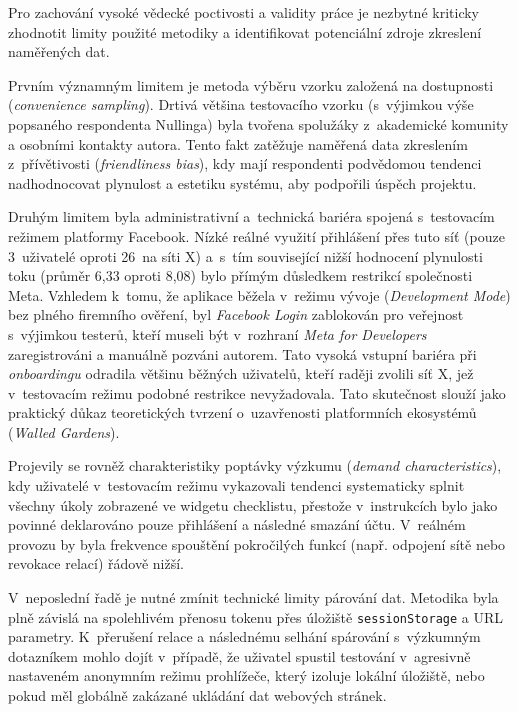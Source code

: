 \documentclass[male,czech,api_bc]{kitheses}
\begin{document}
Pro zachování vysoké vědecké poctivosti a validity práce je nezbytné kriticky zhodnotit limity použité metodiky a identifikovat potenciální zdroje zkreslení naměřených dat. 

Prvním významným limitem je metoda výběru vzorku založená na dostupnosti (\textit{convenience sampling}). Drtivá většina testovacího vzorku (s~výjimkou výše popsaného respondenta Nullinga) byla tvořena spolužáky z~akademické komunity a osobními kontakty autora. Tento fakt zatěžuje naměřená data zkreslením z~přívětivosti (\textit{friendliness bias}), kdy mají respondenti podvědomou tendenci nadhodnocovat plynulost a estetiku systému, aby podpořili úspěch projektu.

Druhým limitem byla administrativní a~technická bariéra spojená s~testovacím režimem platformy Facebook. Nízké reálné využití přihlášení přes tuto síť (pouze 3~uživatelé oproti 26~na síti X) a~s~tím související nižší hodnocení plynulosti toku (průměr 6,33 oproti 8,08) bylo přímým důsledkem restrikcí společnosti Meta. Vzhledem k~tomu, že aplikace běžela v~režimu vývoje (\textit{Development Mode}) bez plného firemního ověření, byl \textit{Facebook Login} zablokován pro veřejnost s~výjimkou testerů, kteří museli být v~rozhraní \textit{Meta for Developers} zaregistrováni a manuálně pozváni autorem. Tato vysoká vstupní bariéra při \textit{onboardingu} odradila většinu běžných uživatelů, kteří raději zvolili síť X, jež v~testovacím režimu podobné restrikce nevyžadovala. Tato skutečnost slouží jako praktický důkaz teoretických tvrzení o~uzavřenosti platformních ekosystémů (\textit{Walled Gardens}).

Projevily se rovněž charakteristiky poptávky výzkumu (\textit{demand characteristics}), kdy uživatelé v~testovacím režimu vykazovali tendenci systematicky splnit všechny úkoly zobrazené ve widgetu checklistu, přestože v~instrukcích bylo jako povinné deklarováno pouze přihlášení a následné smazání účtu. V~reálném provozu by byla frekvence spouštění pokročilých funkcí (např. odpojení sítě nebo revokace relací) řádově nižší.

V~neposlední řadě je nutné zmínit technické limity párování dat. Metodika byla plně závislá na spolehlivém přenosu tokenu přes úložiště \texttt{sessionStorage} a URL parametry. K~přerušení relace a následnému selhání spárování s~výzkumným dotazníkem mohlo dojít v~případě, že uživatel spustil testování v~agresivně nastaveném anonymním režimu prohlížeče, který izoluje lokální úložiště, nebo pokud měl globálně zakázané ukládání dat webových stránek.
\end{document}
